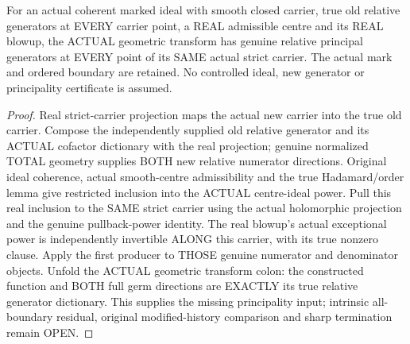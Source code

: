 \begin{theorem}
\label{hir:sharp-actual-admissible-geometric-transform-relative-principal}
\leanok
For an actual coherent marked ideal with smooth closed carrier, true old
relative generators at EVERY carrier point, a REAL admissible centre and
its REAL blowup, the ACTUAL geometric transform has genuine relative
principal generators at EVERY point of its SAME actual strict carrier.
The actual mark and ordered boundary are retained. No controlled ideal,
new generator or principality certificate is assumed.
\end{theorem}
\begin{proof}
Real strict-carrier projection maps the actual new carrier into the true
old carrier. Compose the independently supplied old relative generator
and its ACTUAL cofactor dictionary with the real projection; genuine
normalized TOTAL geometry supplies BOTH new relative numerator directions.
Original ideal coherence, actual smooth-centre admissibility and the true
Hadamard/order lemma give restricted inclusion into the ACTUAL centre-ideal
power. Pull this real inclusion to the SAME strict carrier using the
actual holomorphic projection and the genuine pullback-power identity.
The real blowup's actual exceptional power is independently invertible
ALONG this carrier, with its true nonzero clause. Apply the first producer
to THOSE genuine numerator and denominator objects. Unfold the ACTUAL
geometric transform colon: the constructed function and BOTH full germ
directions are EXACTLY its true relative generator dictionary. This
supplies the missing principality input; intrinsic all-boundary residual,
original modified-history comparison and sharp termination remain OPEN.
\end{proof}
